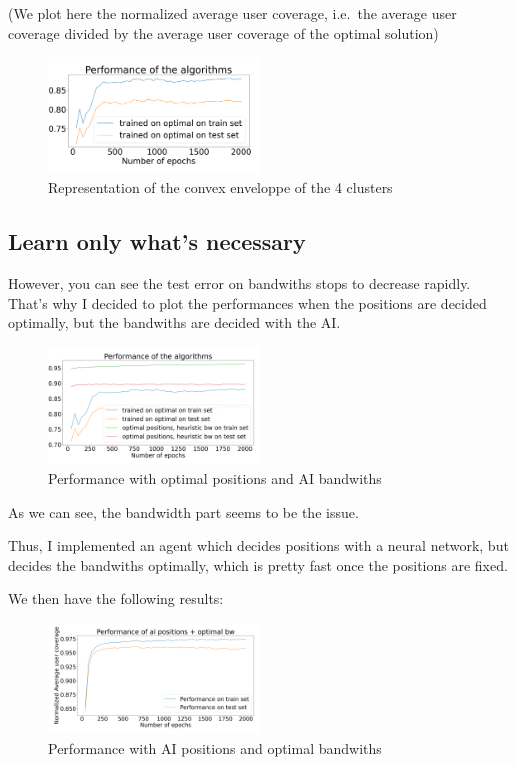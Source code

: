 \documentclass[letterpaper]{article}
\begin{document}
(We plot here the normalized average user coverage, i.e.\, the average user coverage divided by the average user coverage of the optimal solution)


\begin{figure}[H]
    \centering
    \includegraphics[width=0.5\textwidth]{images/bilan_en _fonction epochs.png}
    \caption{Representation of the convex enveloppe of the 4 clusters}
\end{figure}

\subsection{Learn only what's necessary}

However, you can see the test error on bandwiths stops to decrease rapidly.
That's why I decided to plot the performances when the positions are decided optimally, but the bandwiths are decided with the AI.

\begin{figure}[H]
    \centering
    \includegraphics[width=0.5\textwidth]{images/bilan_en _fonction epochs_aibw.png}
    \caption{Performance with optimal positions and AI bandwiths}
\end{figure}

As we can see, the bandwidth part seems to be the issue.

Thus, I implemented an agent which decides positions with a neural network, but decides the bandwiths optimally,
which is pretty fast once the positions are fixed.

We then have the following results:

\begin{figure}[H]
    \centering
    \includegraphics[width=0.5\textwidth]{images/mix_results.png}
    \caption{Performance with AI positions and optimal bandwiths}
\end{figure}
\end{document}
